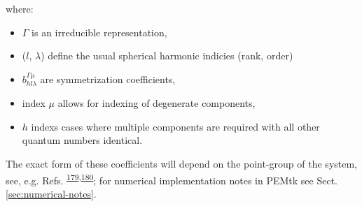 \documentclass[10pt]{article}
\providecommand{\tightlist}{\setlength{\itemsep}{0pt}\setlength{\parskip}{0pt}}%
\begin{document}
where: 

\begin{itemize}
\item $\Gamma$ is an irreducible representation, 
\item ($l$, $\lambda$) define the usual spherical harmonic indicies (rank, order)
\item $b_{hl\lambda}^{\Gamma\mu}$ are symmetrization coefficients, 
\item index $\mu$ allows for indexing of degenerate components,
\item $h$ indexs cases where multiple components are required with all other quantum numbers identical. 
\end{itemize}
    
The exact form of these coefficients will depend on the point-group of the system, see, e.g. Refs. \textsuperscript{\hyperref[csl:179]{179},\hyperref[csl:180]{180}}; for numerical implementation notes in PEMtk see Sect. \ref{sec:numerical-notes}.


\end{document}
